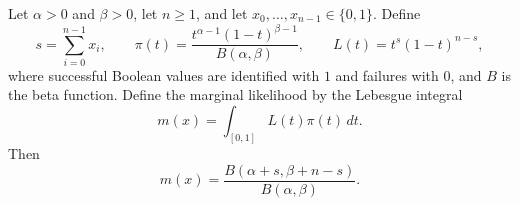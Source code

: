 \begin{theorem}
Let $\alpha>0$ and $\beta>0$, let $n\geq1$, and let
$x_0,\ldots,x_{n-1}\in\{0,1\}$. Define
\[
 s=\sum_{i=0}^{n-1}x_i,
 \qquad
 \pi(t)=\frac{t^{\alpha-1}(1-t)^{\beta-1}}{B(\alpha,\beta)},
 \qquad
 L(t)=t^s(1-t)^{n-s},
\]
where successful Boolean values are identified with $1$ and failures with
$0$, and $B$ is the beta function. Define the marginal likelihood by the
Lebesgue integral
\[
 m(x)=\int_{[0,1]}L(t)\pi(t)\,dt.
\]
Then
\[
 m(x)=\frac{B(\alpha+s,\beta+n-s)}{B(\alpha,\beta)}.
\]
\end{theorem}
